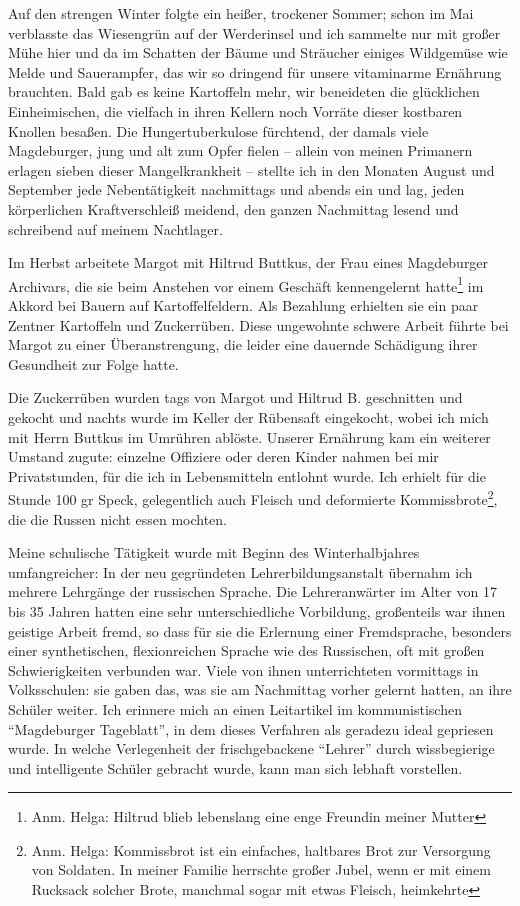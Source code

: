 \documentclass[a5paper,pagesize,10pt,twoside=true]{scrbook}
\renewcommand{\marginpar}[2][]{}
\begin{document}
Auf den strengen Winter folgte ein heißer, trockener Sommer; schon im Mai verblasste das Wiesengrün auf der Werderinsel und ich sammelte nur mit großer Mühe hier und da im Schatten der Bäume und Sträucher einiges Wildgemüse wie Melde und Sauerampfer, das wir so dringend für unsere vitaminarme Ernährung brauchten. Bald gab es keine Kartoffeln mehr, wir beneideten die glücklichen Einheimischen, die vielfach in ihren Kellern noch Vorräte dieser kostbaren Knollen besaßen. Die Hungertuberkulose fürchtend, der damals viele Magdeburger, jung und alt zum Opfer fielen -- \marginpar{137} allein von meinen Primanern erlagen sieben dieser Mangelkrankheit -- stellte ich in den Monaten August und September jede Nebentätigkeit nachmittags und abends ein und lag, jeden körperlichen Kraftverschleiß meidend, den ganzen Nachmittag lesend und schreibend auf meinem Nachtlager.

Im Herbst arbeitete Margot mit Hiltrud Buttkus, der Frau eines Magdeburger Archivars, die sie beim Anstehen vor einem Geschäft kennengelernt hatte\footnote{Anm. Helga: Hiltrud blieb lebenslang eine enge Freundin meiner Mutter} im Akkord bei Bauern auf Kartoffelfeldern. Als Bezahlung erhielten sie ein paar Zentner Kartoffeln und Zuckerrüben. Diese ungewohnte schwere Arbeit führte bei Margot zu einer Überanstrengung, die leider eine dauernde Schädigung ihrer Gesundheit zur Folge hatte.

Die Zuckerrüben wurden tags von Margot und Hiltrud B. geschnitten und gekocht und nachts wurde im Keller der Rübensaft eingekocht, wobei ich mich mit Herrn Buttkus im Umrühren ablöste. Unserer Ernährung kam ein weiterer Umstand zugute: einzelne Offiziere oder deren Kinder nahmen bei mir Privatstunden, für die ich in Lebensmitteln entlohnt wurde. Ich erhielt für die Stunde 100 gr Speck, gelegentlich auch Fleisch und deformierte Kommissbrote\footnote{Anm. Helga: Kommissbrot ist ein einfaches, haltbares Brot zur Versorgung von Soldaten. In meiner Familie herrschte großer Jubel, wenn er mit einem Rucksack solcher Brote, manchmal sogar mit etwas Fleisch, heimkehrte}, die die Russen nicht essen mochten.

Meine schulische Tätigkeit wurde mit Beginn des Winterhalbjahres umfangreicher: In der neu gegründeten Lehrerbildungsanstalt übernahm ich mehrere Lehrgänge der russischen Sprache. Die Lehreranwärter im Alter von 17 bis 35 Jahren hatten eine sehr unterschiedliche Vorbildung, großenteils war ihnen geistige Arbeit fremd, so dass für sie die Erlernung einer Fremdsprache, besonders einer synthetischen, flexionreichen Sprache wie des Russischen, oft mit großen Schwierigkeiten verbunden war. Viele von ihnen unterrichteten vormittags in Volksschulen: sie gaben das, was sie am Nachmittag vorher gelernt hatten, an ihre Schüler weiter. Ich erinnere mich an einen Leitartikel im kommunistischen \enquote{Magdeburger Tageblatt}, \marginpar{138} in dem dieses Verfahren als geradezu ideal gepriesen wurde. In welche Verlegenheit der frischgebackene \enquote{Lehrer} durch wissbegierige und intelligente Schüler gebracht wurde, kann man sich lebhaft vorstellen.
\end{document}

